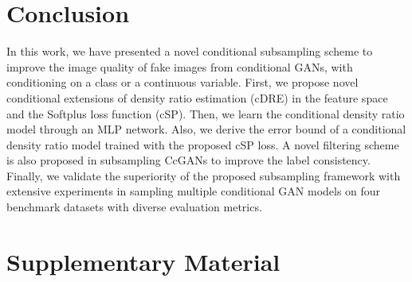 \documentclass[final,12pt, 3p,times]{elsarticle}
\begin{document}
\section{Conclusion} \label{sec:conclusion}
In this work, we have presented a novel conditional subsampling scheme to improve the image quality of fake images from conditional GANs, with conditioning on a class or a continuous variable. First, we propose novel conditional extensions of density ratio estimation (cDRE) in the feature space and the Softplus loss function (cSP). Then, we learn the conditional density ratio model through an MLP network. Also, we derive the error bound of a conditional density ratio model trained with the proposed cSP loss. A novel filtering scheme is also proposed in subsampling CcGANs to improve the label consistency. Finally, we validate the superiority of the proposed subsampling framework with extensive experiments in sampling multiple conditional GAN models on four benchmark datasets with diverse evaluation metrics. 


 


\clearpage
\newpage
\appendix

\section*{Supplementary Material}
\renewcommand{\thesection}{S.\arabic{section}} 
\renewcommand{\thesubsection}{\thesection.\arabic{subsection}}
\renewcommand\thefigure{\thesection.\arabic{figure}}
\renewcommand\thetable{\thesection.\arabic{table}}
\renewcommand{\theequation}{S.\arabic{equation}}
\renewcommand{\thetheorem}{S.\arabic{theorem}} 
\renewcommand{\thedefinition}{S.\arabic{definition}} 
\renewcommand{\thelemma}{S.\arabic{lemma}} 
\renewcommand{\theremark}{S.\arabic{remark}}
\end{document}
